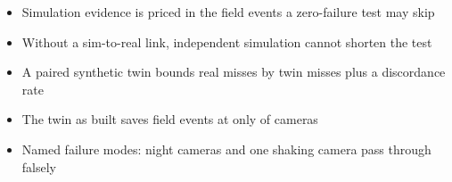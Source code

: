 \begin{itemize}
\item Simulation evidence is priced in the field events a zero-failure test may skip
\item Without a sim-to-real link, independent simulation cannot shorten the test
\item A paired synthetic twin bounds real misses by twin misses plus a discordance rate
\item The twin as built saves field events at only \nTcamfinOPS{} of \nMainScenes{} cameras
\item Named failure modes: night cameras and one shaking camera pass through falsely
\end{itemize}
